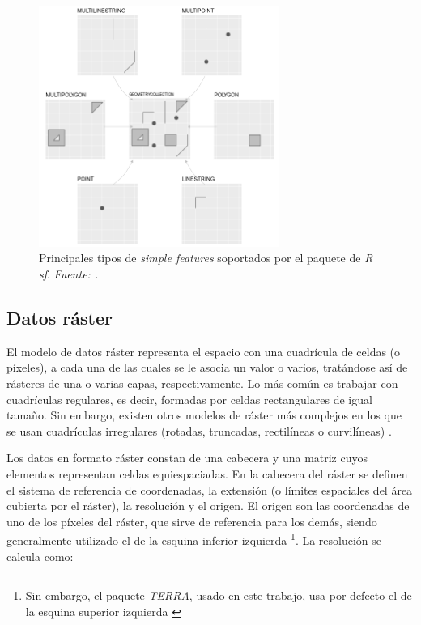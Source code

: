 \documentclass[12pt,a4paper,]{book}
\let\rmarkdownfootnote\footnote%
\def\footnote{\protect\rmarkdownfootnote}
\numberwithin{dummy}{section}
\theoremstyle{ocrenumbox}
\theoremstyle{blacknumex}
\theoremstyle{blacknumbox}
\theoremstyle{ocrenum}
\theoremstyle{ocrenum}
\begin{document}
\begin{figure}[H]
\centering
\includegraphics[width = 0.7\textwidth]{graficos/sf-classes.png}
\caption[Principales tipos de \textit{simple features} soportados por el paquete de \textit{R sf}]{Principales tipos de \textit{simple features} soportados por el paquete de \textit{R sf}. \it Fuente: \citet{lovelace_geocomputation_2019}.}
\label{fig:sf-classes}
\end{figure}

\hypertarget{datos-ruxe1ster}{%
\subsection{Datos ráster}\label{datos-ruxe1ster}}

El modelo de datos ráster representa el espacio con una cuadrícula de
celdas (o píxeles), a cada una de las cuales se le asocia un valor o
varios, tratándose así de rásteres de una o varias capas,
respectivamente. Lo más común es trabajar con cuadrículas regulares, es
decir, formadas por celdas rectangulares de igual tamaño. Sin embargo,
existen otros modelos de ráster más complejos en los que se usan
cuadrículas irregulares (rotadas, truncadas, rectilíneas o curvilíneas)
\citep{lovelace_geocomputation_2019}.

Los datos en formato ráster constan de una cabecera y una matriz cuyos
elementos representan celdas equiespaciadas. En la cabecera del ráster
se definen el sistema de referencia de coordenadas, la extensión (o
límites espaciales del área cubierta por el ráster), la resolución y el
origen. El origen son las coordenadas de uno de los píxeles del ráster,
que sirve de referencia para los demás, siendo generalmente utilizado el
de la esquina inferior izquierda \footnote{Sin embargo, el paquete
  \emph{TERRA}, usado en este trabajo, usa por defecto el de la esquina
  superior izquierda \citep{terrapackage}}. La resolución se calcula
como:
\end{document}

